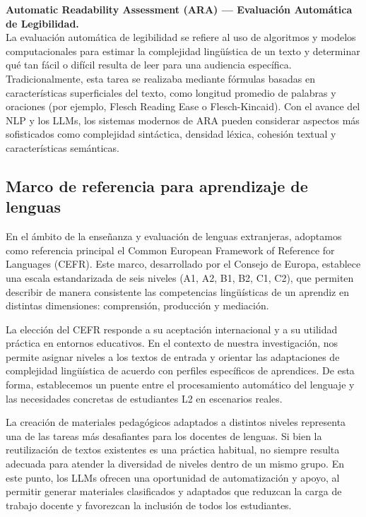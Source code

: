 \noindent\textbf{Automatic Readability Assessment (ARA) — Evaluación Automática de Legibilidad.\cite{Feng2010}} \\
La evaluación automática de legibilidad se refiere al uso de algoritmos y modelos computacionales para estimar la complejidad lingüística de un texto y determinar qué tan fácil o difícil resulta de leer para una audiencia específica. Tradicionalmente, esta tarea se realizaba mediante fórmulas basadas en características superficiales del texto, como longitud promedio de palabras y oraciones (por ejemplo, Flesch Reading Ease\cite{Flesch1948} o Flesch-Kincaid\cite{Kincaid1975}). Con el avance del NLP y los LLMs, los sistemas modernos de ARA pueden considerar aspectos más sofisticados como complejidad sintáctica, densidad léxica, cohesión textual y características semánticas.\\


\subsection{Marco de referencia para aprendizaje de lenguas} \label{subsec:aprend_leng}
En el ámbito de la enseñanza y evaluación de lenguas extranjeras, adoptamos como referencia principal el Common European Framework of Reference for Languages (CEFR). Este marco, desarrollado por el Consejo de Europa, establece una escala estandarizada de seis niveles (A1, A2, B1, B2, C1, C2), que permiten describir de manera consistente las competencias lingüísticas de un aprendiz en distintas dimensiones: comprensión, producción y mediación.

La elección del CEFR responde a su aceptación internacional y a su utilidad práctica en entornos educativos. En el contexto de nuestra investigación, nos permite asignar niveles a los textos de entrada y orientar las adaptaciones de complejidad lingüística de acuerdo con perfiles específicos de aprendices. De esta forma, establecemos un puente entre el procesamiento automático del lenguaje y las necesidades concretas de estudiantes L2 en escenarios reales.

La creación de materiales pedagógicos adaptados a distintos niveles representa una de las tareas más desafiantes para los docentes de lenguas. Si bien la reutilización de textos existentes es una práctica habitual, no siempre resulta adecuada para atender la diversidad de niveles dentro de un mismo grupo. En este punto, los LLMs ofrecen una oportunidad de automatización y apoyo, al permitir generar materiales clasificados y adaptados que reduzcan la carga de trabajo docente y favorezcan la inclusión de todos los estudiantes.

